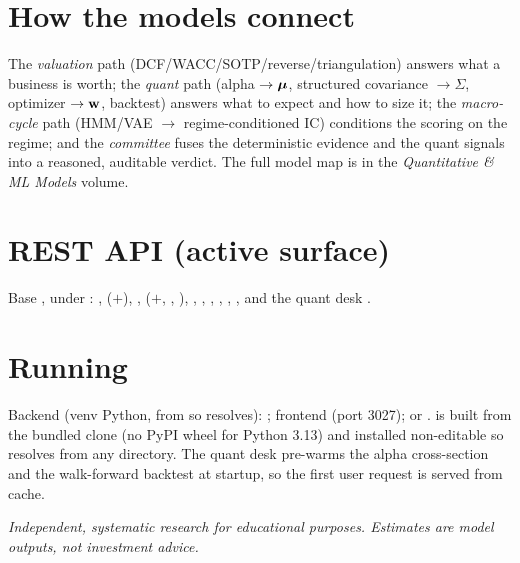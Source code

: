 \documentclass[11pt]{article}
\begin{document}
\section{How the models connect}
The \emph{valuation} path (DCF/WACC/SOTP/reverse/triangulation) answers what a
business is worth; the \emph{quant} path (alpha $\to\boldsymbol{\mu}$, structured covariance
$\to\Sigma$, optimizer $\to\mathbf{w}$, backtest) answers what to expect and how to size
it; the \emph{macro-cycle} path (HMM/VAE $\to$ regime-conditioned IC) conditions the
scoring on the regime; and the \emph{committee} fuses the deterministic evidence and
the quant signals into a reasoned, auditable verdict. The full model map is in the
\emph{Quantitative \& ML Models} volume.

\section{REST API (active surface)}
Base , under : , 
($+$), , 
($+$, , ), ,
, , , , , and the quant desk
.

\section{Running}
Backend (venv Python, from  so  resolves):
; frontend  (port 3027); or
.  is built from the bundled clone (no PyPI
wheel for Python 3.13) and installed non-editable so  resolves from
any directory. The quant desk pre-warms the alpha cross-section and the walk-forward
backtest at startup, so the first user request is served from cache.

\vfill
\begin{center}\small\color{muted}
\emph{Independent, systematic research for educational purposes. Estimates are model
outputs, not investment advice.}
\end{center}
\end{document}
